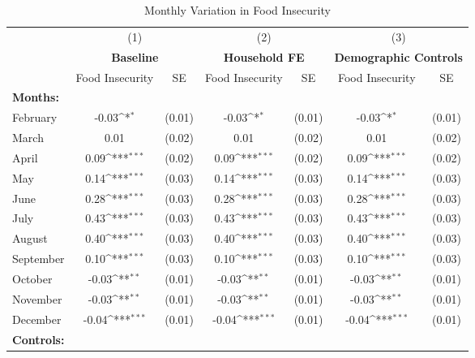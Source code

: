 \begin{table}[htbp]\centering \small
\def\sym#1{\ifmmode^{#1}\else\(^{#1}\)\fi}
\caption{Monthly Variation in Food Insecurity \label{month_insecurity}}
\begin{tabular}{l*{3}{cc}}
\toprule
                &\multicolumn{2}{c}{(1)}     &\multicolumn{2}{c}{(2)}     &\multicolumn{2}{c}{(3)}     \\
                &\multicolumn{2}{c}{  \textbf{Baseline}  }&\multicolumn{2}{c}{\textbf{Household FE}}&\multicolumn{2}{c}{ \textbf{Demographic Controls}}\\
                &Food Insecurity         &       SE&Food Insecurity         &       SE&Food Insecurity         &       SE\\
\midrule
\textbf{Months:}&                  &         &                  &         &                  &         \\
February        &    -0.03\sym{*}  &   (0.01)&    -0.03\sym{*}  &   (0.01)&    -0.03\sym{*}  &   (0.01)\\
March           &     0.01         &   (0.02)&     0.01         &   (0.02)&     0.01         &   (0.02)\\
April           &     0.09\sym{***}&   (0.02)&     0.09\sym{***}&   (0.02)&     0.09\sym{***}&   (0.02)\\
May             &     0.14\sym{***}&   (0.03)&     0.14\sym{***}&   (0.03)&     0.14\sym{***}&   (0.03)\\
June            &     0.28\sym{***}&   (0.03)&     0.28\sym{***}&   (0.03)&     0.28\sym{***}&   (0.03)\\
July            &     0.43\sym{***}&   (0.03)&     0.43\sym{***}&   (0.03)&     0.43\sym{***}&   (0.03)\\
August          &     0.40\sym{***}&   (0.03)&     0.40\sym{***}&   (0.03)&     0.40\sym{***}&   (0.03)\\
September       &     0.10\sym{***}&   (0.03)&     0.10\sym{***}&   (0.03)&     0.10\sym{***}&   (0.03)\\
October         &    -0.03\sym{**} &   (0.01)&    -0.03\sym{**} &   (0.01)&    -0.03\sym{**} &   (0.01)\\
November        &    -0.03\sym{**} &   (0.01)&    -0.03\sym{**} &   (0.01)&    -0.03\sym{**} &   (0.01)\\
December        &    -0.04\sym{***}&   (0.01)&    -0.04\sym{***}&   (0.01)&    -0.04\sym{***}&   (0.01)\\
\textbf{Controls:}&                  &         &                  &         &                  &         \\

\end{tabular}
\end{table}
